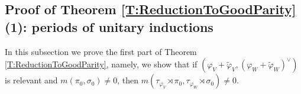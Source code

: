 \documentclass[11pt,letterpaper]{amsart}
\theoremstyle{plain}
\newcounter{theorem}[section]
\numberwithin{theorem}{section}
\numberwithin{equation}{subsection}
\theoremstyle{remark}
\begin{document}
\vskip 5pt


\subsection{Proof of Theorem \ref{T:ReductionToGoodParity}(1): periods of unitary inductions} %
\label{sub:proof_of_theorem_t:reductiontogoodparity_the_}

In this subsection we prove the first part of Theorem \ref{T:ReductionToGoodParity}, namely, we show that if $\left(\varphi_V + \widetilde{\varphi}_V,\left(\varphi_W + \widetilde{\varphi}_W\right)^\vee\right)$ is relevant and $m\left(\pi_0,\sigma_0\right)\neq0$, then $m\left(\tau_{\varphi_V}\rtimes\pi_0, \tau_{\varphi_W}\rtimes \sigma_0\right)\neq 0$.

\vskip 5pt
\end{document}

